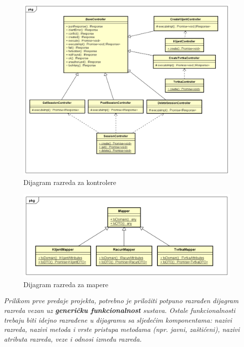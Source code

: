 		\begin{figure}[H]
			\includegraphics[width=1\linewidth]{dijagrami/Class Diagram - controllers.png}
			\caption{Dijagram razreda za kontrolere}
			\label{fig:Dijagram razreda - Kontroleri} 
		\end{figure}	
		\begin{figure}[H]
			\includegraphics[width=1\linewidth]{dijagrami/Class Diagram - mappers.png}
			\caption{Dijagram razreda za mapere}
			\label{fig:Dijagram razreda - Maperri} 
		\end{figure}
		
			
			\textit{Prilikom prve predaje projekta, potrebno je priložiti potpuno razrađen dijagram razreda vezan uz \textbf{generičku funkcionalnost} sustava. Ostale funkcionalnosti trebaju biti idejno razrađene u dijagramu sa sljedećim komponentama: nazivi razreda, nazivi metoda i vrste pristupa metodama (npr. javni, zaštićeni), nazivi atributa razreda, veze i odnosi između razreda.}\\
			

